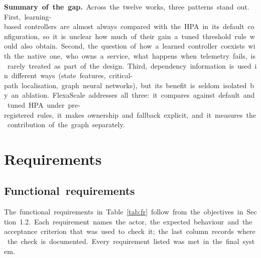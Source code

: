 \documentclass[12pt,a4paper,oneside]{report}
\begin{document}
\begin{landscape}
\textbf{Summary~of~the~gap.}~Across~the~twelve~works,~three~patterns~stand~out.~First,~learning-based~controllers~are~almost~always~compared~with~the~HPA~in~its~default~configuration,~so~it~is~unclear~how~much~of~their~gain~a~tuned~threshold~rule~would~also~obtain.~Second,~the~question~of~how~a~learned~controller~coexists~with~the~native~one,~who~owns~a~service,~what~happens~when~telemetry~fails,~is~rarely~treated~as~part~of~the~design.~Third,~dependency~information~is~used~in~different~ways~(state~features,~critical-path~localisation,~graph~neural~networks),~but~its~benefit~is~seldom~isolated~by~an~ablation.~FlexaScale~addresses~all~three:~it~compares~against~default~and~tuned~HPA~under~pre-registered~rules,~it~makes~ownership~and~fallback~explicit,~and~it~measures~the~contribution~of~the~graph~separately.


\end{landscape}\clearpage

\clearpage
\chapter{Requirements}\label{chap:req}

\section{Functional~requirements}

The~functional~requirements~in~Table~\ref{tab:fr}~follow~from~the~objectives~in~Section~1.2.~Each~requirement~names~the~actor,~the~expected~behaviour~and~the~acceptance~criterion~that~was~used~to~check~it;~the~last~column~records~where~the~check~is~documented.~Every~requirement~listed~was~met~in~the~final~system.
\end{document}

